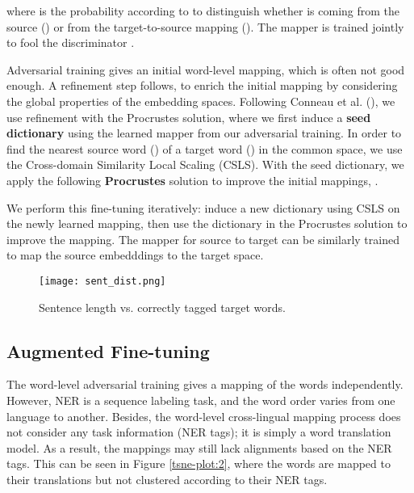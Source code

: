 \documentclass[letterpaper]{article} \usepackage{aaai20}  \usepackage{times}  \usepackage{helvet} \usepackage{courier}  \usepackage[hyphens]{url}  \usepackage{graphicx} \urlstyle{rm} \def\UrlFont{\rm}  \usepackage{graphicx}  \frenchspacing  \setlength{\pdfpagewidth}{8.5in}  \setlength{\pdfpageheight}{11in}
\begin{document}
\noindent where  is the probability according to  to distinguish whether  is coming from the source () or from the target-to-source mapping (). The mapper  is trained jointly to fool the discriminator . 



Adversarial training gives an initial word-level mapping, which is often not good enough. A refinement step follows, to enrich the initial mapping by considering the global properties of the embedding spaces. Following Conneau et al. (\citeyear{MUSE}), we use refinement with the Procrustes solution, where we first induce a \textbf{seed dictionary}  using the learned mapper from our adversarial training. In order to find the nearest source word () of a target word () in the common space, we use the Cross-domain Similarity Local Scaling (CSLS).
With the seed dictionary, we apply the following \textbf{Procrustes} solution to improve the initial mappings, . 




\normalsize



\noindent We perform this fine-tuning iteratively: induce a new dictionary using CSLS on the newly learned mapping, then use the dictionary in the Procrustes solution to improve the mapping. The mapper for source to target  can be similarly trained to map the source embedddings to the target space. 







\begin{figure}[t!]
    \centering
  \texttt{[image: sent\_dist.png]}
  \caption{Sentence length vs. correctly tagged target words.}
  \label{fig:sent_dist:1}
\end{figure}

\subsection{Augmented Fine-tuning} 

The word-level adversarial training gives a mapping of the words independently. However, NER is a sequence labeling task, and the word order varies from one language to another. Besides, the word-level cross-lingual mapping process does not consider any task information (NER tags); it is simply a word translation model. As a result, the mappings may still lack alignments based on the NER tags. {This can be seen in Figure \ref{tsne-plot:2}, where the words are mapped to their translations but not clustered according to their NER tags.}
\end{document}

